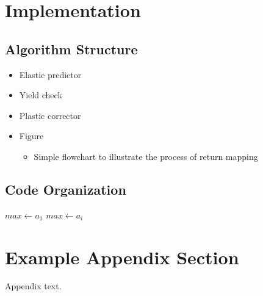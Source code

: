 \documentclass[final,5p,times,twocolumn]{elsarticle}
\begin{document}
\section{Implementation}
\label{Implementation}

\subsection{Algorithm Structure}
\label{Algorithm Structure}
\begin{itemize}
  \item Elastic predictor
  \item Yield check
  \item Plastic corrector
  \item Figure
  \begin{itemize}
    \item Simple flowchart to illustrate the process of return mapping
  \end{itemize}
\end{itemize}

\subsection{Code Organization}
\label{Code Organization}

\begin{algorithm}
\DontPrintSemicolon %
$max \gets a_1$\;
 {
   {
    $max \gets a_i$\;
  }
}
\;
\caption{{\sc Max} finds the maximum number}\label{alg:one}
\label{algo:max}
\end{algorithm}


\appendix
\section{Example Appendix Section}
\label{app1}

Appendix text.

\end{document}
